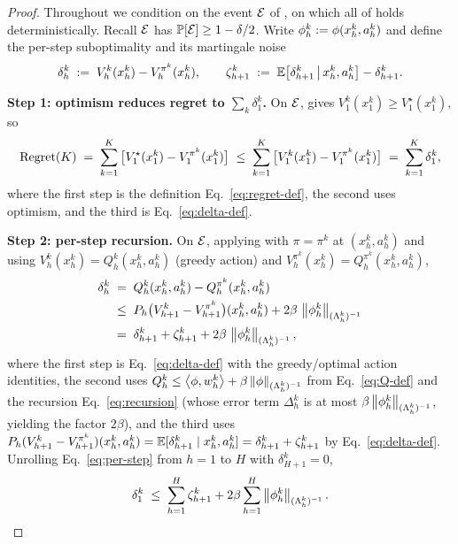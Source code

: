 \begin{proof}
Throughout we condition on the event $\mathcal{E}$ of , on which
all of  holds deterministically. Recall $\mathcal{E}$ has
$\mathbb{P}[\mathcal{E}]\ge1-\delta/2$. Write $\phi_h^k:=\phi(x_h^k,a_h^k)$ and define
the per-step suboptimality and its martingale noise
\begin{align}\label{eq:delta-def}
\delta_h^k \;:=\; V_h^k(x_h^k) - V_h^{\pi^k}(x_h^k),
\qquad
\zeta_{h+1}^k \;:=\; \mathbb{E}\big[\delta_{h+1}^k \,\big|\, x_h^k,a_h^k\big] - \delta_{h+1}^k .
\end{align}

\smallskip\noindent\textbf{Step 1: optimism reduces regret to $\sum_k\delta_1^k$.}
On $\mathcal{E}$,  gives $V_1^k(x_1^k)\ge V_1^\star(x_1^k)$, so
\begin{align}\label{eq:regret-to-delta}
\mathrm{Regret}(K)
\;=\; \sum_{k=1}^K \big[ V_1^\star(x_1^k) - V_1^{\pi^k}(x_1^k) \big]
\;\le\; \sum_{k=1}^K \big[ V_1^k(x_1^k) - V_1^{\pi^k}(x_1^k) \big]
\;=\; \sum_{k=1}^K \delta_1^k,
\end{align}
where the first step is the definition Eq.~\eqref{eq:regret-def}, the second
uses optimism, and the third is Eq.~\eqref{eq:delta-def}.

\smallskip\noindent\textbf{Step 2: per-step recursion.}
On $\mathcal{E}$, applying  with $\pi=\pi^k$ at $(x_h^k,a_h^k)$ and
using $V_h^k(x_h^k)=Q_h^k(x_h^k,a_h^k)$ (greedy action) and $V_h^{\pi^k}(x_h^k)=
Q_h^{\pi^k}(x_h^k,a_h^k)$,
\begin{align}
\delta_h^k
&\;=\; Q_h^k(x_h^k,a_h^k) - Q_h^{\pi^k}(x_h^k,a_h^k) \notag \\
&\;\le\; P_h\big(V_{h+1}^k - V_{h+1}^{\pi^k}\big)(x_h^k,a_h^k) + 2\beta\,\left\| \phi_h^k \right\|_{(\Lambda_h^k)^{-1}} \notag \\
&\;=\; \delta_{h+1}^k + \zeta_{h+1}^k + 2\beta\,\left\| \phi_h^k \right\|_{(\Lambda_h^k)^{-1}}, \label{eq:per-step}
\end{align}
where the first step is Eq.~\eqref{eq:delta-def} with the greedy/optimal action
identities, the second uses $Q_h^k\le\left\langle \phi, w_h^k \right\rangle+\beta\left\| \phi \right\|_{(\Lambda_h^k)^{-1}}$ from Eq.~\eqref{eq:Q-def} and the recursion
Eq.~\eqref{eq:recursion} (whose error term $\Delta_h^k$ is at most $\beta
\left\| \phi_h^k \right\|_{(\Lambda_h^k)^{-1}}$, yielding the factor $2\beta$), and the
third uses $P_h(V_{h+1}^k-V_{h+1}^{\pi^k})(x_h^k,a_h^k)=\mathbb{E}[\delta_{h+1}^k\mid
x_h^k,a_h^k]=\delta_{h+1}^k+\zeta_{h+1}^k$ by Eq.~\eqref{eq:delta-def}.
Unrolling Eq.~\eqref{eq:per-step} from $h=1$ to $H$ with $\delta_{H+1}^k=0$,
\begin{align}\label{eq:unroll}
\delta_1^k \;\le\; \sum_{h=1}^H \zeta_{h+1}^k + 2\beta\sum_{h=1}^H \left\| \phi_h^k \right\|_{(\Lambda_h^k)^{-1}}.
\end{align}


\end{proof}
